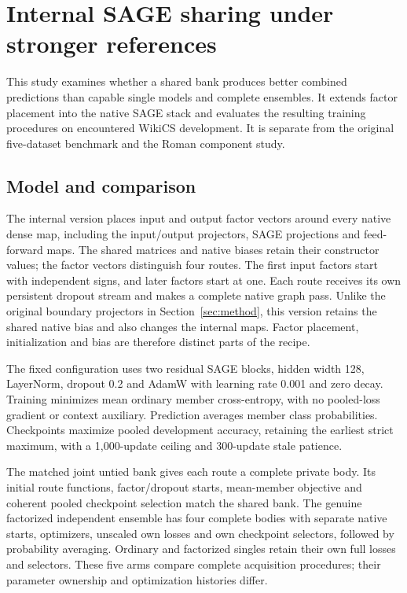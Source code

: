 \section{Internal SAGE sharing under stronger references}\label{sec:internal-sage}
This study examines whether a shared bank produces better combined predictions than capable single models and complete ensembles. It extends factor placement into the native SAGE stack and evaluates the resulting training procedures on encountered WikiCS development. It is separate from the original five-dataset benchmark and the Roman component study.

\subsection{Model and comparison}
The internal version places input and output factor vectors around every native dense map, including the input/output projectors, SAGE projections and feed-forward maps. The shared matrices and native biases retain their constructor values; the factor vectors distinguish four routes. The first input factors start with independent signs, and later factors start at one. Each route receives its own persistent dropout stream and makes a complete native graph pass. Unlike the original boundary projectors in Section~\ref{sec:method}, this version retains the shared native bias and also changes the internal maps. Factor placement, initialization and bias are therefore distinct parts of the recipe.

The fixed configuration uses two residual SAGE blocks, hidden width 128, LayerNorm, dropout 0.2 and AdamW with learning rate 0.001 and zero decay. Training minimizes mean ordinary member cross-entropy, with no pooled-loss gradient or context auxiliary. Prediction averages member class probabilities. Checkpoints maximize pooled development accuracy, retaining the earliest strict maximum, with a 1,000-update ceiling and 300-update stale patience.

The matched joint untied bank gives each route a complete private body. Its initial route functions, factor/dropout starts, mean-member objective and coherent pooled checkpoint selection match the shared bank. The genuine factorized independent ensemble has four complete bodies with separate native starts, optimizers, unscaled own losses and own checkpoint selectors, followed by probability averaging. Ordinary and factorized singles retain their own full losses and selectors. These five arms compare complete acquisition procedures; their parameter ownership and optimization histories differ.

